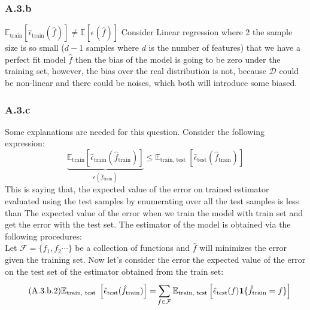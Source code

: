 \documentclass[]{article}
\begin{document}
    \subsubsection*{A.3.b}
        $\mathbb{E}_{\text{train}}\left[\hat{\epsilon}_\text{train}(\hat{f})\right]\ne \mathbb{E}\left[\epsilon(\hat{f})\right]$ Consider Linear regression where 2 the sample size is so small ($d - 1$ samples where $d$ is the number of features) that we have a perfect fit model $\hat{f}$ then the bias of the model is going to be zero under the training set, however, the bias over the real distribution is not, because $\mathcal{D}$ could be non-linear and there could be noises, which both will introduce some biased. 
    \subsubsection*{A.3.c}
        Some explanations are needed for this question. Consider the following expression: 
        \begin{equation*}\tag{A.3.b.1}\label{eqn:A.3.b.1}
            \underbrace{\mathbb{E}_\text{train} 
            \left[\hat{\epsilon}_\text{train}(\hat{f}_\text{train})\right]}_{\epsilon(\hat{f}_\text{train})}
            \le
            \mathbb{E}_{\text{train, test }}\left[
                \hat{\epsilon}_\text{test}
                (\hat{f}_\text{train})
            \right]
        \end{equation*}
        This is saying that, the expected value of the error on trained estimator evaluated using the test samples by enumerating over all the test samples is less than The expected value of the error when we train the model with train set and get the error with the test set. 
        The estimator of the model is obtained via the following procedures: 
        \\[1em]
        Let $\mathcal{F} = \{f_1, f_2\cdots\}$ be a collection of functions and $\hat{f}$ will minimizes the error given the training set. Now let's consider the error the expected value of the error on the test set of the estimator obtained from the train set: 
        \begin{align*}\tag{A.3.b.2}\label{eqn:A.3.b.2}
            \mathbb{E}_{\text{train, test }}\left[
                \hat{\epsilon}_\text{test}
                (\hat{f}_\text{train})
            \right]
            = &
            \sum_{f\in\mathcal{F}}^{}\mathbb{E}_\text{train, test}
            \left[
                \hat{\epsilon}_{\text{\text{test}}}(f)\mathbf{1}\{\hat{f}_\text{train} = f\}
            \right]
        \end{align*}
\end{document}
